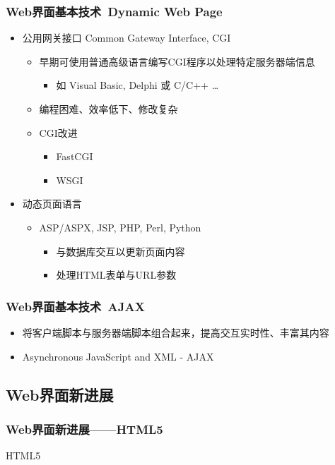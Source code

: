 \documentclass{beamer}
\begin{document}
\begin{frame}
	\frametitle{Web界面基本技术~{\small Dynamic Web Page}}
	\beamertemplatetransparentcovereddynamicmedium
	\begin{itemize}[<+->]
		\item 公用网关接口 Common Gateway Interface, CGI
		\begin{itemize}
			\item 早期可使用普通高级语言编写CGI程序以处理特定服务器端信息
			\begin{itemize}
				\item 如 Visual Basic, Delphi 或 C/C++ \dots
			\end{itemize}
			\item 编程困难、效率低下、修改复杂
			\item CGI改进
			\begin{itemize}
				\item FastCGI
				\item WSGI
			\end{itemize}
		\end{itemize}
		\item 动态页面语言
		\begin{itemize}
			\item ASP/ASPX, JSP, PHP, Perl, Python
			\begin{itemize}
				\item 与数据库交互以更新页面内容
				\item 处理HTML表单与URL参数
			\end{itemize}
		\end{itemize}
	\end{itemize}
\end{frame}

\begin{frame}
	\frametitle{Web界面基本技术~{\small AJAX}}
	\beamertemplatetransparentcovereddynamicmedium
	\begin{itemize}[<+->]
		\item 将客户端脚本与服务器端脚本组合起来，提高交互实时性、丰富其内容
		\item Asynchronous JavaScript and XML - AJAX
	\end{itemize}
\end{frame}

\subsection{Web界面新进展}
\begin{frame}
	\frametitle{Web界面新进展——HTML5}
	HTML5~\cite{hickson2007html}
\end{frame}
\end{document}
